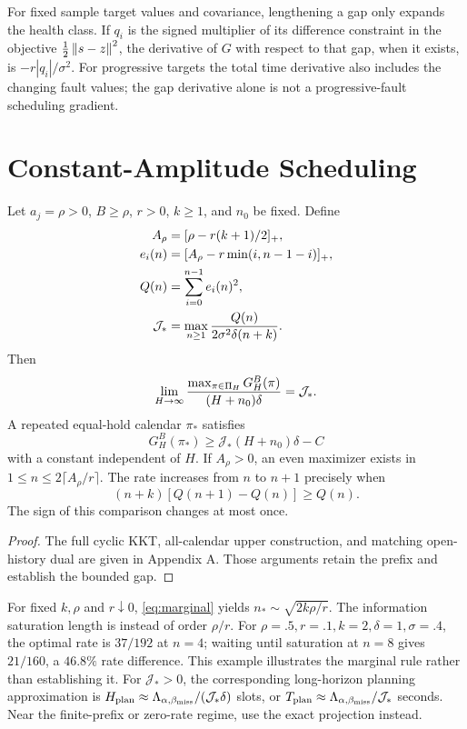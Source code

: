 For fixed sample target values and covariance, lengthening a gap only expands the health class. If $q_i$ is the signed multiplier of its difference constraint in the objective $\frac12\left\lVert s-z\right\rVert^2$, the derivative of $G$ with respect to that gap, when it exists, is $-r|q_i|/\sigma^2$. For progressive targets the total time derivative also includes the changing fault values; the gap derivative alone is not a progressive-fault scheduling gradient.

\section{Constant-Amplitude Scheduling}
\begin{theorem}\label{thm:constant}
Let $a_j=\rho>0$, $B\ge\rho$, $r>0$, $k\ge1$, and $n_0$ be fixed. Define
\begin{align}
 A_\rho&=[\rho-r(k+1)/2]_+,\\
 e_i(n)&=[A_\rho-r\min(i,n-1-i)]_+,\\
 Q(n)&=\sum_{i=0}^{n-1}e_i(n)^2,\\
 \mathcal J_*&=\max_{n\ge1}\frac{Q(n)}{2\sigma^2\delta(n+k)}.\label{eq:constant_rate}
\end{align}
Then
\begin{equation}
 \lim_{H\to\infty}\frac{\max_{\pi\in\Pi_H}G_H^B(\pi)}{(H+n_0)\delta}
 =\mathcal J_*.
\end{equation}
A repeated equal-hold calendar $\pi_*$ satisfies
\begin{equation}
 G_H^B(\pi_*)\ge\mathcal J_*(H+n_0)\delta-C
\end{equation}
with a constant independent of $H$. If $A_\rho>0$, an even maximizer exists in $1\le n\le2\lceil A_\rho/r\rceil$. The rate increases from $n$ to $n+1$ precisely when
\begin{equation}
 (n+k)[Q(n+1)-Q(n)]\ge Q(n).\label{eq:marginal}
\end{equation}
The sign of this comparison changes at most once.
\end{theorem}
\begin{proof}
The full cyclic KKT, all-calendar upper construction, and matching open-history dual are given in Appendix A. Those arguments retain the prefix and establish the bounded gap.\end{proof}
For fixed $k,\rho$ and $r\downarrow0$, \eqref{eq:marginal} yields $n_*\sim\sqrt{2k\rho/r}$. The information saturation length is instead of order $\rho/r$. For $\rho=.5,r=.1,k=2,\delta=1,\sigma=.4$, the optimal rate is $37/192$ at $n=4$; waiting until saturation at $n=8$ gives $21/160$, a $46.8\%$ rate difference. This example illustrates the marginal rule rather than establishing it. For $\mathcal J_*>0$, the corresponding long-horizon planning approximation is $H_{\rm plan}\approx\Lambda_{\alpha,\beta_{\rm miss}}/(\mathcal J_*\delta)$ slots, or $T_{\rm plan}\approx\Lambda_{\alpha,\beta_{\rm miss}}/\mathcal J_*$ seconds. Near the finite-prefix or zero-rate regime, use the exact projection instead.

